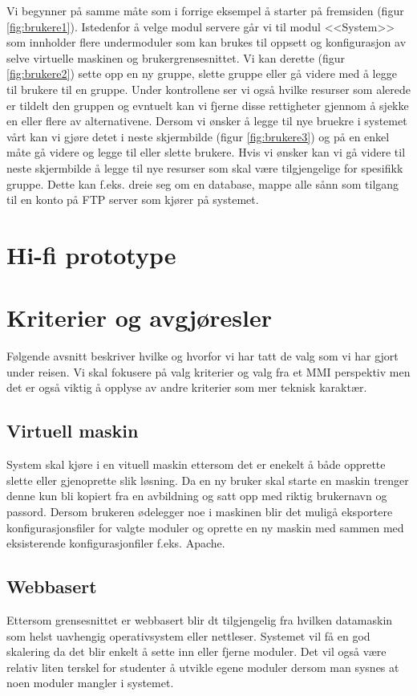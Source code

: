 Vi begynner på samme måte som i forrige eksempel å starter på fremsiden (figur \ref{fig:brukere1}). Istedenfor å velge modul servere går vi til modul <<System>> som innholder flere undermoduler som kan brukes til oppsett og konfigurasjon av selve virtuelle maskinen og brukergrensesnittet. 
Vi kan derette (figur \ref{fig:brukere2}) sette opp en ny gruppe, slette gruppe eller gå videre med å legge til brukere til en gruppe. Under kontrollene ser vi også hvilke resurser som alerede er tildelt den gruppen og evntuelt kan vi fjerne disse rettigheter gjennom å sjekke en eller flere av alternativene.
Dersom vi ønsker å legge til nye bruekre i systemet vårt kan vi gjøre detet i neste skjermbilde (figur \ref{fig:brukere3}) og på en enkel måte gå videre og legge til eller slette brukere.
Hvis vi ønsker kan vi gå videre til neste skjermbilde å legge til nye resurser som skal være tilgjengelige for spesifikk gruppe. Dette kan f.eks. dreie seg om en database, mappe alle sånn som tilgang til en konto på FTP server som kjører på systemet. 

\section{Hi-fi prototype}

\section{Kriterier og avgjøresler}
Følgende avsnitt beskriver hvilke og hvorfor vi har tatt de valg som vi har gjort under reisen. Vi skal fokusere på valg kriterier og valg fra et MMI perspektiv men det er også viktig å opplyse av andre kriterier som mer teknisk karaktær.

\subsection{Virtuell maskin}
System skal kjøre i en vituell maskin ettersom det er enekelt å både opprette slette eller gjenoprette slik løsning. Da en ny bruker skal starte en maskin trenger denne kun bli kopiert fra en avbildning og satt opp med riktig brukernavn og passord. Dersom brukeren ødelegger noe i maskinen blir det muligå eksportere konfigurasjonsfiler for valgte moduler og oprette en ny maskin med sammen med eksisterende konfigurasjonfiler f.eks. Apache.

\subsection{Webbasert}
Ettersom grensesnittet er webbasert blir dt tilgjengelig fra hvilken datamaskin som helst uavhengig operativsystem eller nettleser. Systemet vil få en god skalering da  det blir enkelt å sette inn eller fjerne moduler. Det vil også være relativ liten terskel for studenter å utvikle egene moduler dersom man sysnes at noen moduler mangler i systemet. 

